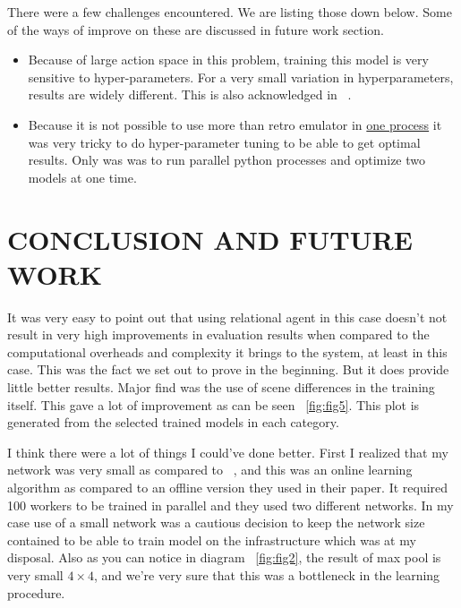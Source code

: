 \documentclass[english]{sobraep}
\begin{document}
There were a few challenges encountered. We are listing those down below. Some of the ways of improve on these are discussed in future work section.

\begin{itemize}
    \item Because of large action space in this problem, training this model is very sensitive to hyper-parameters. For a very small variation in hyperparameters, results are widely different. This is also acknowledged in ~\cite{zambaldi2018deep}.
    
    \item Because it is not possible to use more than retro emulator in \href{https://github.com/openai/retro/issues/64}{one process} it was very tricky to do hyper-parameter tuning to be able to get optimal results. Only was was to run parallel python processes and optimize two models at one time.
    
\end{itemize}

\section{CONCLUSION AND FUTURE WORK}

It was very easy to point out that using relational agent in this case doesn't not result in very high improvements in evaluation results when compared to the computational overheads and complexity it brings to the system, at least in this case. This was the fact we set out to prove in the beginning. But it does provide little better results. Major find was the use of scene differences in the training itself. This gave a lot of improvement as can be seen ~\ref{fig:fig5}. This plot is generated from the selected trained models in each category.

I think there were a lot of things I could've done better. First I realized that my network was very small as compared to  ~\cite{zambaldi2018deep}, and this was an online learning algorithm as compared to an offline version they used in their paper. It required 100 workers to be trained in parallel and they used two different networks. In my case use of a small network was a cautious decision to keep the network size contained to be able to train model on the infrastructure which was at my disposal. Also as you can notice in diagram ~\ref{fig:fig2}, the result of max pool is very small $4\times4$, and we're very sure that this was a bottleneck in the learning procedure. 
\end{document}
